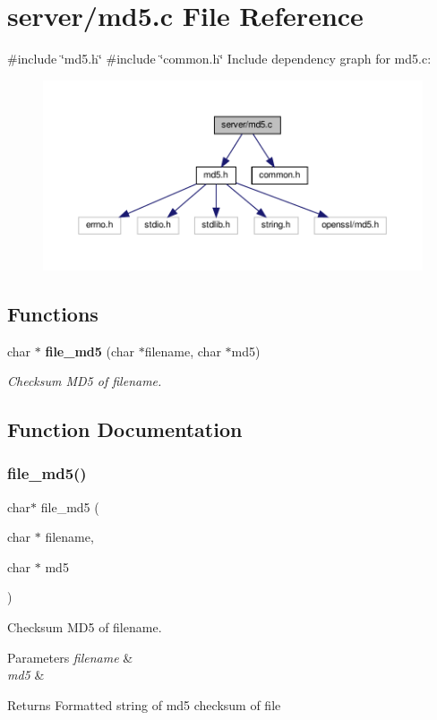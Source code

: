 \section{server/md5.c File Reference}
\label{md5_8c}
{\ttfamily \#include \char`\"{}md5.\+h\char`\"{}}\newline
{\ttfamily \#include \char`\"{}common.\+h\char`\"{}}\newline
Include dependency graph for md5.\+c\+:
\nopagebreak
\begin{figure}[H]
\begin{center}
\leavevmode
\includegraphics[width=350pt]{md5_8c__incl}
\end{center}
\end{figure}
\subsection*{Functions}
\begin{DoxyCompactItemize}
\item 
char $\ast$ \textbf{ file\+\_\+md5} (char $\ast$filename, char $\ast$md5)
\begin{DoxyCompactList}\small\item\em Checksum M\+D5 of filename. \end{DoxyCompactList}\end{DoxyCompactItemize}


\subsection{Function Documentation}
\mbox{\label{md5_8c_adaa982699055a63eb33d040e7d13f965}} 
\subsubsection{file\+\_\+md5()}
{\footnotesize\ttfamily char$\ast$ file\+\_\+md5 (\begin{DoxyParamCaption}\item[{char $\ast$}]{filename,  }\item[{char $\ast$}]{md5 }\end{DoxyParamCaption})}



Checksum M\+D5 of filename. 


\begin{DoxyParams}{Parameters}
{\em filename} & \\
\hline
{\em md5} & \\
\hline
\end{DoxyParams}
\begin{DoxyReturn}{Returns}
Formatted string of md5 checksum of file 
\end{DoxyReturn}
